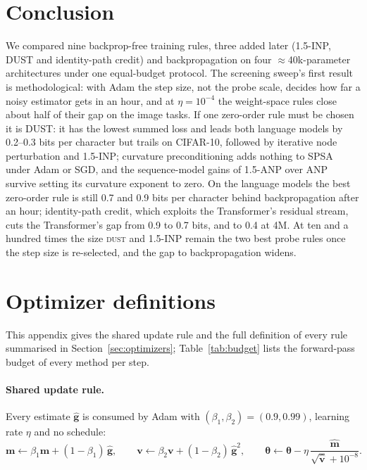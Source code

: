 \documentclass{article}
\newcommand{\method}[1]{\textsc{#1}}
\newcommand{\DUST}{\method{dust}}
\newcommand{\ghat}{\hat{\mathbf{g}}}
\newcommand{\btheta}{\boldsymbol{\theta}}
\begin{document}
\section{Conclusion}
\label{sec:conclusion}

We compared nine backprop-free training rules, three added later (1.5-INP, DUST and identity-path credit) and
backpropagation on four
$\approx$40k-parameter architectures under one equal-budget protocol. The screening
sweep's first result is methodological: with Adam the step size, not the probe scale,
decides how far a noisy estimator gets in an hour, and at $\eta=10^{-4}$ the weight-space
rules close about half of their gap on the image tasks.
If one zero-order rule must be chosen it is DUST: it has the lowest summed loss and leads both language
models by 0.2--0.3 bits per character but trails on CIFAR-10, followed by iterative node
perturbation and 1.5-INP; curvature preconditioning adds nothing to SPSA under
Adam or SGD, and the sequence-model gains of 1.5-ANP over ANP survive setting its
curvature exponent to zero. On the language models the best zero-order rule is still 0.7 and 0.9 bits per character
behind backpropagation after an hour; identity-path credit, which exploits the Transformer's
residual stream, cuts the Transformer's gap from 0.9 to 0.7 bits, and to 0.4 at 4M. At ten and a hundred times the size \DUST{} and 1.5-INP remain the two best probe rules
once the step size is re-selected, and the gap to backpropagation widens.




\appendix

\section{Optimizer definitions}
\label{app:optimizers}

This appendix gives the shared update rule and the full definition of every rule
summarised in Section~\ref{sec:optimizers}; Table~\ref{tab:budget} lists the
forward-pass budget of every method per step.

\paragraph{Shared update rule.}
Every estimate $\ghat$ is consumed by Adam \citep{kingma2015} with
$(\beta_1,\beta_2)=(0.9,0.99)$, learning rate $\eta$ and no schedule:
\begin{equation}
  \mathbf{m}\leftarrow\beta_1\mathbf{m}+(1-\beta_1)\,\ghat,\qquad
  \mathbf{v}\leftarrow\beta_2\mathbf{v}+(1-\beta_2)\,\ghat^{2},\qquad
  \btheta\leftarrow\btheta-\eta\,\frac{\hat{\mathbf{m}}}{\sqrt{\hat{\mathbf{v}}}+10^{-8}}.
  \label{eq:adam}
\end{equation}
\end{document}
